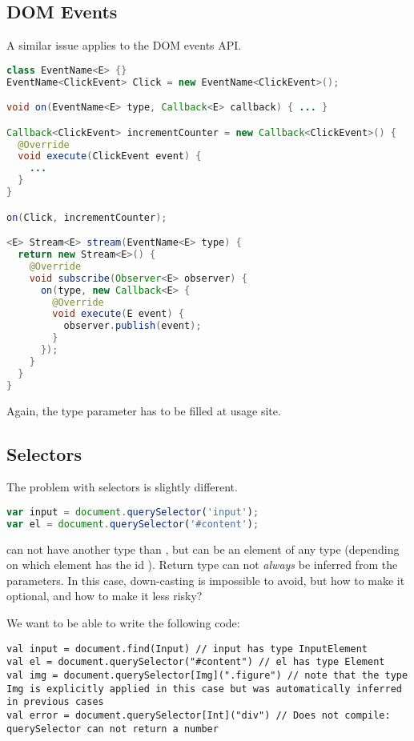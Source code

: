 \documentclass[runningheads,a4paper]{llncs}
\begin{document}
\subsection{DOM Events}

A similar issue applies to the DOM events API.

\begin{lstlisting}[language=Java]
class EventName<E> {}
EventName<ClickEvent> Click = new EventName<ClickEvent>();

void on(EventName<E> type, Callback<E> callback) { ... }

Callback<ClickEvent> incrementCounter = new Callback<ClickEvent>() {
  @Override
  void execute(ClickEvent event) {
    ...
  }
}

on(Click, incrementCounter);

<E> Stream<E> stream(EventName<E> type) {
  return new Stream<E>() {
    @Override
    void subscribe(Observer<E> observer) {
      on(type, new Callback<E> {
        @Override
        void execute(E event) {
          observer.publish(event);
        }
      });
    }
  }
}

\end{lstlisting}

Again, the type parameter  has to be filled at usage site.

\subsection{Selectors}

The problem with selectors is slightly different.

\begin{lstlisting}[language=JavaScript]
var input = document.querySelector('input');
var el = document.querySelector('#content');
\end{lstlisting}

 can not have another type than , but  can be an element of any type (depending
on which element has the id ). Return type can not \emph{always} be inferred from the parameters.
In this case, down-casting is impossible to avoid, but how to make it optional, and how to make it less risky?

We want to be able to write the following code:

\begin{lstlisting}
val input = document.find(Input) // input has type InputElement
val el = document.querySelector("#content") // el has type Element
val img = document.querySelector[Img](".figure") // note that the type Img is explicitly applied in this case but was automatically inferred in previous cases
val error = document.querySelector[Int]("div") // Does not compile: querySelector can not return a number
\end{lstlisting}
\end{document}
